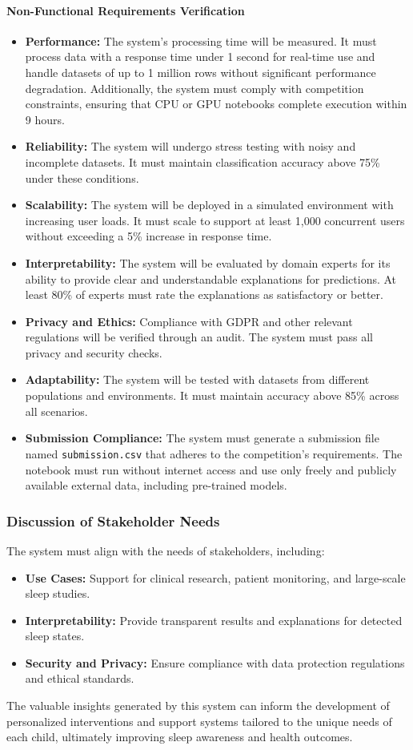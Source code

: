 \documentclass[conference]{IEEEtran}
\begin{document}
\paragraph{Non-Functional Requirements Verification}
\begin{itemize}
    \item \textbf{Performance:} The system's processing time will be measured. It must process data with a response time under 1 second for real-time use and handle datasets of up to 1 million rows without significant performance degradation. Additionally, the system must comply with competition constraints, ensuring that CPU or GPU notebooks complete execution within 9 hours.
    \item \textbf{Reliability:} The system will undergo stress testing with noisy and incomplete datasets. It must maintain classification accuracy above 75\% under these conditions.
    \item \textbf{Scalability:} The system will be deployed in a simulated environment with increasing user loads. It must scale to support at least 1,000 concurrent users without exceeding a 5\% increase in response time.
    \item \textbf{Interpretability:} The system will be evaluated by domain experts for its ability to provide clear and understandable explanations for predictions. At least 80\% of experts must rate the explanations as satisfactory or better.
    \item \textbf{Privacy and Ethics:} Compliance with GDPR and other relevant regulations will be verified through an audit. The system must pass all privacy and security checks.
    \item \textbf{Adaptability:} The system will be tested with datasets from different populations and environments. It must maintain accuracy above 85\% across all scenarios.
    \item \textbf{Submission Compliance:} The system must generate a submission file named \texttt{submission.csv} that adheres to the competition's requirements. The notebook must run without internet access and use only freely and publicly available external data, including pre-trained models.
\end{itemize}


\subsubsection{Discussion of Stakeholder Needs}
The system must align with the needs of stakeholders, including:
\begin{itemize}
	\item \textbf{Use Cases:} Support for clinical research, patient monitoring, and large-scale sleep studies.
	\item \textbf{Interpretability:} Provide transparent results and explanations for detected sleep states.
	\item \textbf{Security and Privacy:} Ensure compliance with data protection regulations and ethical standards.
\end{itemize}

The valuable insights generated by this system can inform the development of personalized interventions and support systems tailored to the unique needs of each child, ultimately improving sleep awareness and health outcomes.
\end{document}
